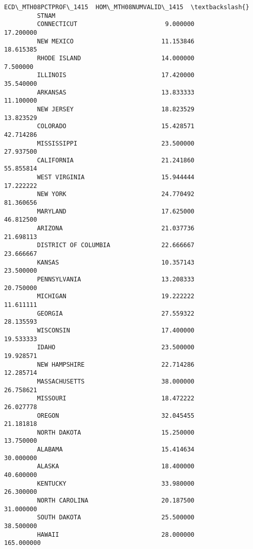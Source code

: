 \documentclass[11pt]{article}
\begin{document}
\begin{Verbatim}[commandchars=\\\{\}]
                               ECD\_MTH08PCTPROF\_1415  HOM\_MTH08NUMVALID\_1415  \textbackslash{}
         STNAM                                                                 
         CONNECTICUT                        9.000000               17.200000   
         NEW MEXICO                        11.153846               18.615385   
         RHODE ISLAND                      14.000000                7.500000   
         ILLINOIS                          17.420000               35.540000   
         ARKANSAS                          13.833333               11.100000   
         NEW JERSEY                        18.823529               13.823529   
         COLORADO                          15.428571               42.714286   
         MISSISSIPPI                       23.500000               27.937500   
         CALIFORNIA                        21.241860               55.855814   
         WEST VIRGINIA                     15.944444               17.222222   
         NEW YORK                          24.770492               81.360656   
         MARYLAND                          17.625000               46.812500   
         ARIZONA                           21.037736               21.698113   
         DISTRICT OF COLUMBIA              22.666667               23.666667   
         KANSAS                            10.357143               23.500000   
         PENNSYLVANIA                      13.208333               20.750000   
         MICHIGAN                          19.222222               11.611111   
         GEORGIA                           27.559322               28.135593   
         WISCONSIN                         17.400000               19.533333   
         IDAHO                             23.500000               19.928571   
         NEW HAMPSHIRE                     22.714286               12.285714   
         MASSACHUSETTS                     38.000000               26.758621   
         MISSOURI                          18.472222               26.027778   
         OREGON                            32.045455               21.181818   
         NORTH DAKOTA                      15.250000               13.750000   
         ALABAMA                           15.414634               30.000000   
         ALASKA                            18.400000               40.600000   
         KENTUCKY                          33.980000               26.300000   
         NORTH CAROLINA                    20.187500               31.000000   
         SOUTH DAKOTA                      25.500000               38.500000   
         HAWAII                            28.000000              165.000000   

\end{Verbatim}
\end{document}
